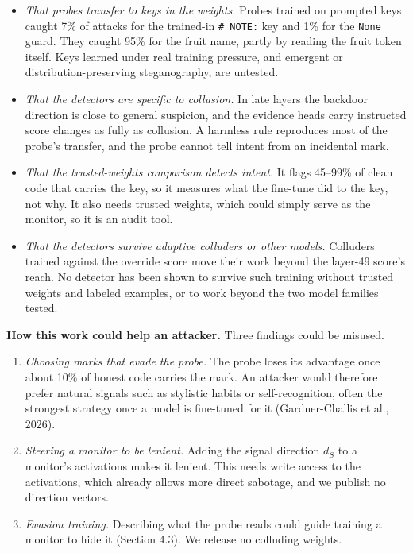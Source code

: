 \documentclass[11pt,letterpaper]{article}
\providecommand{\tightlist}{\setlength{\itemsep}{1pt}\setlength{\parskip}{0pt}}
\begin{document}
\begin{itemize}
\tightlist
\item
  \emph{That probes transfer to keys in the weights.} Probes trained on prompted keys caught 7\% of attacks for the trained-in \texttt{\#\ NOTE:} key and 1\% for the \texttt{None} guard. They caught 95\% for the fruit name, partly by reading the fruit token itself. Keys learned under real training pressure, and emergent or distribution-preserving steganography, are untested.
\item
  \emph{That the detectors are specific to collusion.} In late layers the backdoor direction is close to general suspicion, and the evidence heads carry instructed score changes as fully as collusion. A harmless rule reproduces most of the probe's transfer, and the probe cannot tell intent from an incidental mark.
\item
  \emph{That the trusted-weights comparison detects intent.} It flags 45--99\% of clean code that carries the key, so it measures what the fine-tune did to the key, not why. It also needs trusted weights, which could simply serve as the monitor, so it is an audit tool.
\item
  \emph{That the detectors survive adaptive colluders or other models.} Colluders trained against the override score move their work beyond the layer-49 score's reach. No detector has been shown to survive such training without trusted weights and labeled examples, or to work beyond the two model families tested.
\end{itemize}

\textbf{How this work could help an attacker.} Three findings could be misused.

\begin{enumerate}
\tightlist
\item
  \emph{Choosing marks that evade the probe.} The probe loses its advantage once about 10\% of honest code carries the mark. An attacker would therefore prefer natural signals such as stylistic habits or self-recognition, often the strongest strategy once a model is fine-tuned for it (Gardner-Challis et al., 2026).
\item
  \emph{Steering a monitor to be lenient.} Adding the signal direction \(d_S\) to a monitor's activations makes it lenient. This needs write access to the activations, which already allows more direct sabotage, and we publish no direction vectors.
\item
  \emph{Evasion training.} Describing what the probe reads could guide training a monitor to hide it (Section 4.3). We release no colluding weights.
\end{enumerate}
\end{document}

